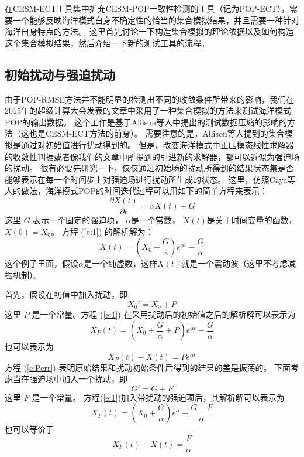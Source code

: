 在CESM-ECT工具集中扩充CESM-POP一致性检测的工具（记为POP-ECT），需要一个能够反映海洋模式自身不确定性的恰当的集合模拟结果，并且需要一种针对海洋自身特点的方法。
这里首先讨论一下构造集合模拟的理论依据以及如何构造这个集合模拟结果，然后介绍一下新的测试工具的流程。 


\subsection{初始扰动与强迫扰动}\label{verify:pertub}

由于POP-RMSE方法并不能明显的检测出不同的收敛条件所带来的影响，我们在2015年的超级计算大会发表的文章中采用了一种集合模拟的方法来测试海洋模式POP的输出数据\cite{yong2015}。 
这个工作是基于Allison等人\cite{baker2014methodology}中提出的测试数据压缩的影响的方法（这也是CESM-ECT方法的前身）。
需要注意的是，Allison等人提到的集合模拟是通过对初始值进行扰动得到的。 
但是，改变海洋模式中正压模态线性求解器的收敛性判据或者像我们的文章\cite{yong2015}中所提到的引进新的求解器，都可以近似为强迫场的扰动。 
很有必要先研究一下，仅仅通过初始场的扰动所得到的结果状态集是否能够表示在每一个时间步上对强迫场进行扰动所生成的状态。
这里，仿照Caya等人\cite{caya1998}的做法，海洋模式POP的时间迭代过程可以用如下的简单方程来表示：
\begin{equation}
\frac{\partial X(t)}{\partial t} = \alpha X(t) +G
\label{e:1}
\end{equation}
这里 $G$ 表示一个固定的强迫项，  $\alpha$是一个常数，  $X(t)$是关于时间变量的函数， $X(0) = X_0$。 
方程 (\ref{e:1}) 的解析解为：
\begin{equation}
X(t) = (X_0 +\frac{G}{\alpha})e^{\alpha t } -\frac{G}{\alpha}
\label{e:2}
\end{equation}
这个例子里面，假设$\alpha$是一个纯虚数，这样$X(t)$就是一个震动波（这里不考虑减振机制）。 

 
首先，假设在初值中加入扰动，即
\begin{equation*}
X_0' =X_0+P
\end{equation*}
这里 $P$ 是一个常量。方程 (\ref{e:1}) 在采用扰动后的初始值之后的解析解可以表示为 
\begin{equation}
X_P(t) = (X_0+\frac{G}{\alpha}+P)e^{\alpha t } -\frac{G}{\alpha}
\label{e:Pan}
\end{equation}
也可以表示为
\begin{equation}
X_P(t)-X(t) = Pe^{\alpha t }
\label{e:Perr}
\end{equation}
方程 (\ref{e:Perr}) 表明原始结果和扰动初始条件后得到的结果的差是振荡的。
下面考虑当在强迫场中加入一个扰动，即
\begin{equation*}
G' = G + F
\end{equation*}
这里 $F$ 是一个常量。  方程(\ref{e:1})加入带扰动的强迫项后，其解析解可以表示为
\begin{equation}
X_F(t) = (X_0 +\frac{G}{\alpha})e^{\alpha } -\frac{G+F}{\alpha}
\label{e:Fan}
\end{equation}
也可以等价于
\begin{equation}
X_F(t)-X(t) = \frac{F}{\alpha} 
\label{e:Ferr}
\end{equation}

